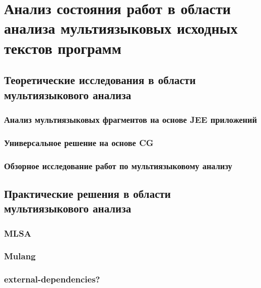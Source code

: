 \section{Анализ состояния работ в области анализа мультиязыковых исходных текстов программ}

\subsection{Теоретические исследования в области мультиязыкового анализа}

\subsubsection{Анализ мультиязыковых фрагментов на основе JEE приложений}

\subsubsection{Универсальное решение на основе CG}

\subsubsection{Обзорное исследование работ по мультиязыковому анализу}


\subsection{Практические решения в области мультиязыкового анализа}

\subsubsection{MLSA}

\subsubsection{Mulang}

\subsubsection{external-dependencies?}

\clearpage